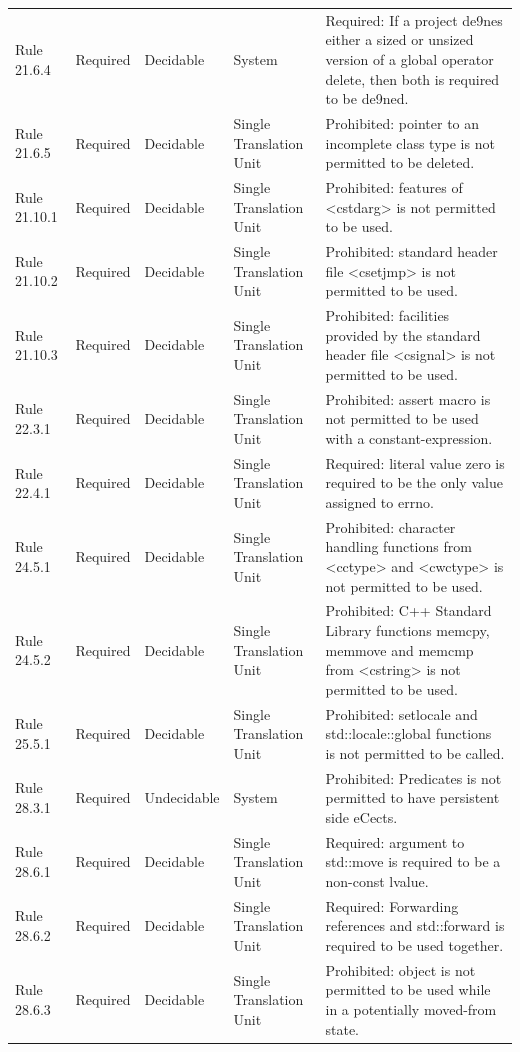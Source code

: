 \documentclass[11pt]{article}
\begin{document}
{\begin{longtable}{@{}P{2.2cm}P{1.7cm}P{2.1cm}P{3.0cm}P{6.7cm}@{}}
Rule 21.6.4 & Required & Decidable & System & Required: If a project de9nes either a sized or unsized version of a global operator delete, then both is required to be de9ned. \\
Rule 21.6.5 & Required & Decidable & Single Translation Unit & Prohibited: pointer to an incomplete class type is not permitted to be deleted. \\
Rule 21.10.1 & Required & Decidable & Single Translation Unit & Prohibited: features of <cstdarg> is not permitted to be used. \\
Rule 21.10.2 & Required & Decidable & Single Translation Unit & Prohibited: standard header file <csetjmp> is not permitted to be used. \\
Rule 21.10.3 & Required & Decidable & Single Translation Unit & Prohibited: facilities provided by the standard header file <csignal> is not permitted to be used. \\
Rule 22.3.1 & Required & Decidable & Single Translation Unit & Prohibited: assert macro is not permitted to be used with a constant-expression. \\
Rule 22.4.1 & Required & Decidable & Single Translation Unit & Required: literal value zero is required to be the only value assigned to errno. \\
Rule 24.5.1 & Required & Decidable & Single Translation Unit & Prohibited: character handling functions from <cctype> and <cwctype> is not permitted to be used. \\
Rule 24.5.2 & Required & Decidable & Single Translation Unit & Prohibited: C++ Standard Library functions memcpy, memmove and memcmp from <cstring> is not permitted to be used. \\
Rule 25.5.1 & Required & Decidable & Single Translation Unit & Prohibited: setlocale and std::locale::global functions is not permitted to be called. \\
Rule 28.3.1 & Required & Undecidable & System & Prohibited: Predicates is not permitted to have persistent side eCects. \\
Rule 28.6.1 & Required & Decidable & Single Translation Unit & Required: argument to std::move is required to be a non-const lvalue. \\
Rule 28.6.2 & Required & Decidable & Single Translation Unit & Required: Forwarding references and std::forward is required to be used together. \\
Rule 28.6.3 & Required & Decidable & Single Translation Unit & Prohibited: object is not permitted to be used while in a potentially moved-from state. \\

\end{longtable}}
\end{document}
